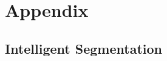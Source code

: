 \documentclass[10pt,letterpaper]{article}
\begin{document}

\section{Appendix}\label{sec:appendix}

\subsection{Intelligent Segmentation}\label{sec:segmentation}


\end{document}
